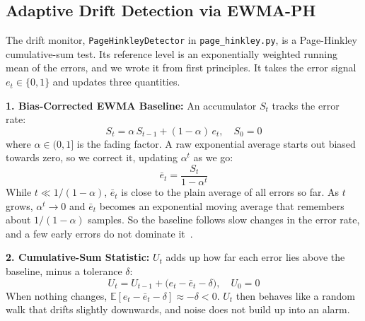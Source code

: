 \documentclass[conference]{IEEEtran}
\begin{document}
\subsection{Adaptive Drift Detection via EWMA-PH}
\label{sec:detector}
The drift monitor, \texttt{PageHinkleyDetector} in \texttt{page\_hinkley.py}, is a Page-Hinkley cumulative-sum test.
Its reference level is an exponentially weighted running mean of the errors, and we wrote it from first principles.
It takes the error signal $e_t \in \{0, 1\}$ and updates three quantities.

\smallskip
\noindent\textbf{1. Bias-Corrected EWMA Baseline:}
An accumulator $S_t$ tracks the error rate:
\begin{equation}
S_t = \alpha \, S_{t-1} + (1 - \alpha) \, e_t, \quad S_0 = 0
\label{eq:ema_accum}
\end{equation}
where $\alpha \in (0, 1]$ is the fading factor.
A raw exponential average starts out biased towards zero, so we correct it, updating $\alpha^t$ as we go:
\begin{equation}
\bar{e}_t = \frac{S_t}{1 - \alpha^t}
\label{eq:ema_mean}
\end{equation}
While $t \ll 1 / (1 - \alpha)$, $\bar{e}_t$ is close to the plain average of all errors so far.
As $t$ grows, $\alpha^t \to 0$ and $\bar{e}_t$ becomes an exponential moving average that remembers about $1 / (1 - \alpha)$ samples.
So the baseline follows slow changes in the error rate, and a few early errors do not dominate it~\cite{rum2026}.

\smallskip
\noindent\textbf{2. Cumulative-Sum Statistic:}
$U_t$ adds up how far each error lies above the baseline, minus a tolerance $\delta$:
\begin{equation}
U_t = U_{t-1} + \bigl(e_t - \bar{e}_t - \delta\bigr), \quad U_0 = 0
\label{eq:cusum}
\end{equation}
When nothing changes, $\mathbb{E}[e_t - \bar{e}_t - \delta] \approx -\delta < 0$.
$U_t$ then behaves like a random walk that drifts slightly downwards, and noise does not build up into an alarm.
\end{document}
